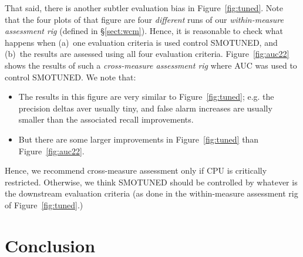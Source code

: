 \documentclass[10pt,conference]{IEEEtran}
\newcommand{\bi}{\begin{itemize}[leftmargin=0.4cm]}
\newcommand{\ei}{\end{itemize}}
\theoremstyle{break}
\theoremstyle{break}
\newcommand{\tion}[1]{{\S}\ref{sect:#1}}
\begin{document}
That said, there is another subtler evaluation bias in  Figure~\ref{fig:tuned}. Note that the four plots of that figure are four {\em different} runs of our  {\em within-measure assessment rig}
(defined in \tion{wcm}). Hence, it is reasonable to check what happens when (a)~one
evaluation criteria is used control SMOTUNED, and (b)~the results are assessed
using all four evaluation criteria. 
Figure~\ref{fig:auc22} shows the results of such a {\em cross-measure assessment rig} where AUC was used to control SMOTUNED. We note that:
\bi
\item
The results in this figure are very similar to   Figure~\ref{fig:tuned}; e.g. the precision deltas aver usually tiny, and false alarm increases are usually smaller than the associated recall improvements. 
\item
But there are some larger improvements in Figure~\ref{fig:tuned}
than Figure~\ref{fig:auc22}.
\ei
Hence, we recommend cross-measure assessment only if CPU is critically restricted. Otherwise, we think SMOTUNED should be controlled by whatever is the downstream evaluation criteria
(as done in the within-measure assessment rig of Figure~\ref{fig:tuned}.)




\section{Conclusion}
\label{sect:conclusion}





\end{document}
